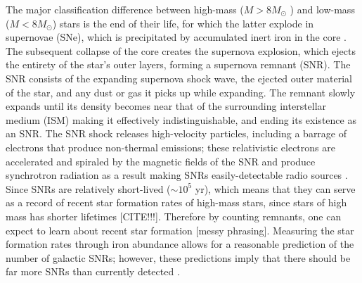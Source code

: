 \documentclass[useAMS,usenatbib]{mn2e}
\begin{document}
The major classification difference between high-mass ($M > 8M_{\odot}$ ) and low-mass ($M < 8 M_\odot$) stars is the end of their life, for which the latter explode in supernovae (SNe), which is precipitated by accumulated inert iron in the core \citep{Arnett.73}.  
The subsequent collapse of the core creates the supernova explosion, which ejects the entirety of the star’s outer layers, forming a supernova remnant (SNR).  The SNR consists of the expanding supernova shock wave, the ejected outer material of the star, and any dust or gas it picks up while expanding.  
The remnant slowly expands until its density becomes near that of the surrounding interstellar medium (ISM) making it effectively indistinguishable, and ending its existence as an SNR.  
The SNR shock releases high-velocity particles, including a barrage of electrons that produce non-thermal emissions; these relativistic electrons are accelerated and spiraled by the magnetic fields of the SNR and produce synchrotron radiation as a result making SNRs easily-detectable radio sources \citep[e.g.][]{Burbidge.56,Stupar_cat.11}. 
Since SNRs are relatively short-lived ($\sim10^5$ yr), which means that they can serve as a record of recent star formation rates of high-mass stars, since stars of high mass has shorter lifetimes {\color{red}[CITE!!!]}.  
Therefore by counting remnants, one can expect to learn about recent star formation {\color{red}[messy phrasing]}.
Measuring the star formation rates through iron abundance allows for a reasonable prediction of the number of galactic SNRs; however, these predictions imply that there should be far more SNRs than currently detected \citep[e.g.][]{Brogan.06}.  

\end{document}
